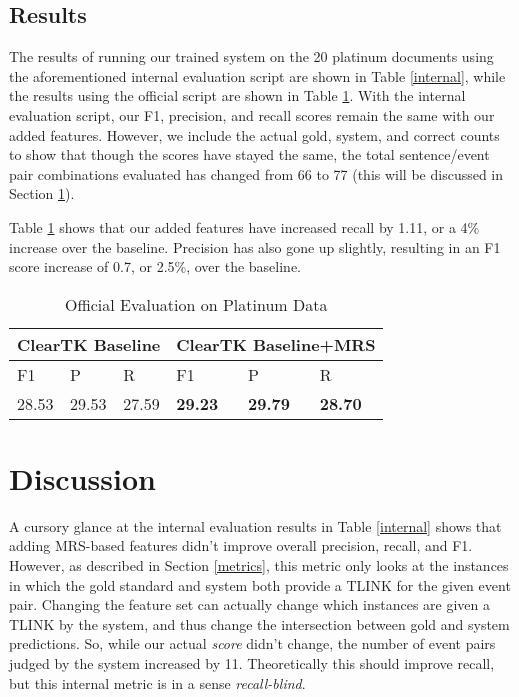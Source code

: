 \documentclass[11pt]{article}
\begin{document}
\subsection{Results}

The results of running our trained system on the 20 platinum documents using the aforementioned internal evaluation script are shown in Table \ref{internal}, while the results using the official script are shown in Table \ref{official}. With the internal evaluation script, our F1, precision, and recall scores remain the same with our added features. However, we include the actual gold, system, and correct counts to show that though the scores have stayed the same, the total sentence/event pair combinations evaluated has changed from 66 to 77 (this will be discussed in Section \ref{discussion}).

Table \ref{official} shows that our added features have increased recall by 1.11, or a 4\% increase over the baseline. Precision has also gone up slightly, resulting in an F1 score increase of 0.7, or 2.5\%, over the baseline.

\begin{table}[H]
\centering
\label{official}
\begin{tabular}{|l|l|l|l|l|l|}
\hline
\multicolumn{3}{|l|}{ClearTK Baseline} & \multicolumn{3}{l|}{ClearTK Baseline+MRS} \\ \hline
F1            & P             & R             & F1            & P            & R            \\ \hline
28.53       & 29.53      & 27.59       & \textbf{29.23}       & \textbf{29.79}      & \textbf{28.70}        \\ \hline
\end{tabular}
\caption{Official Evaluation on Platinum Data \label{official}}
\end{table}


\section{Discussion}
\label{discussion}

A cursory glance at the internal evaluation results in Table \ref{internal} shows that adding MRS-based features didn't improve overall precision, recall, and F1. However, as described in Section \ref{metrics}, this metric only looks at the instances in which the gold standard and system both provide a TLINK for the given event pair. Changing the feature set can actually change which instances are given a TLINK by the system, and thus change the intersection between gold and system predictions. So, while our actual \emph{score} didn't change, the number of event pairs judged by the system increased by 11. Theoretically this should improve recall, but this internal metric is in a sense \emph{recall-blind}.
\end{document}
